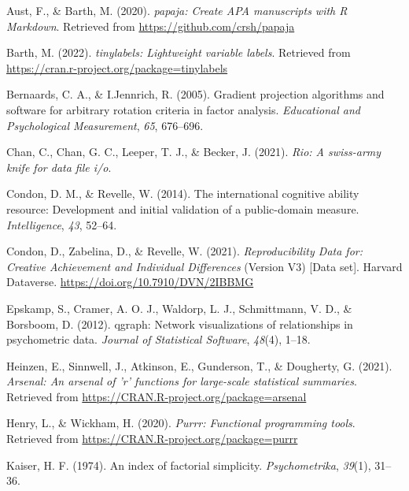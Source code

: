 \documentclass[
  english,
  man]{apa6}
\newlength{\cslhangindent}
\newlength{\cslentryspacingunit} %
\newenvironment{CSLReferences}[2] %
 {%
  \setlength{\parindent}{0pt}
  \ifodd #1
  \let\oldpar\par
  \def\par{\hangindent=\cslhangindent\oldpar}
  \fi
  \setlength{\parskip}{#2\cslentryspacingunit}
 }%
 {}
\begin{document}
\hypertarget{refs}{}
\begin{CSLReferences}{1}{0}
\leavevmode{}%
Aust, F., \& Barth, M. (2020). \emph{{papaja}: {Create} {APA} manuscripts with {R Markdown}}. Retrieved from \url{https://github.com/crsh/papaja}

\leavevmode{}%
Barth, M. (2022). \emph{{tinylabels}: Lightweight variable labels}. Retrieved from \url{https://cran.r-project.org/package=tinylabels}

\leavevmode{}%
Bernaards, C. A., \& I.Jennrich, R. (2005). Gradient projection algorithms and software for arbitrary rotation criteria in factor analysis. \emph{Educational and Psychological Measurement}, \emph{65}, 676--696.

\leavevmode{}%
Chan, C., Chan, G. C., Leeper, T. J., \& Becker, J. (2021). \emph{Rio: A swiss-army knife for data file i/o}.

\leavevmode{}%
Condon, D. M., \& Revelle, W. (2014). The international cognitive ability resource: Development and initial validation of a public-domain measure. \emph{Intelligence}, \emph{43}, 52--64.

\leavevmode{}%
Condon, D., Zabelina, D., \& Revelle, W. (2021). \emph{{Reproducibility Data for: Creative Achievement and Individual Differences}} (Version V3) {[}Data set{]}. Harvard Dataverse. \url{https://doi.org/10.7910/DVN/2IBBMG}

\leavevmode{}%
Epskamp, S., Cramer, A. O. J., Waldorp, L. J., Schmittmann, V. D., \& Borsboom, D. (2012). {qgraph}: Network visualizations of relationships in psychometric data. \emph{Journal of Statistical Software}, \emph{48}(4), 1--18.

\leavevmode{}%
Heinzen, E., Sinnwell, J., Atkinson, E., Gunderson, T., \& Dougherty, G. (2021). \emph{Arsenal: An arsenal of 'r' functions for large-scale statistical summaries}. Retrieved from \url{https://CRAN.R-project.org/package=arsenal}

\leavevmode{}%
Henry, L., \& Wickham, H. (2020). \emph{Purrr: Functional programming tools}. Retrieved from \url{https://CRAN.R-project.org/package=purrr}

\leavevmode{}%
Kaiser, H. F. (1974). An index of factorial simplicity. \emph{Psychometrika}, \emph{39}(1), 31--36.


\end{CSLReferences}
\end{document}
